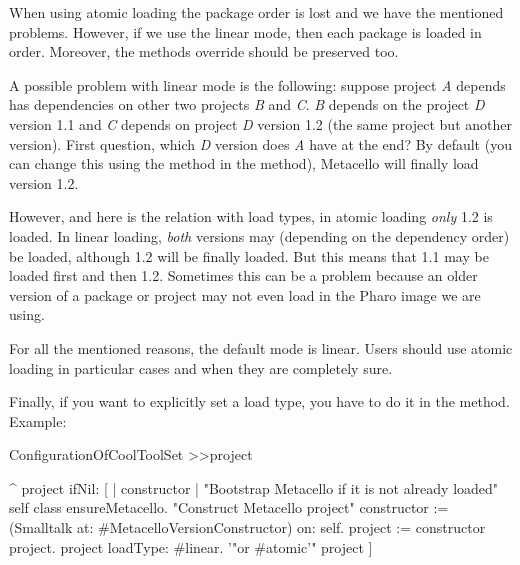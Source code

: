 \documentclass[a4paper,10pt,twoside]{book}
\begin{document}
When using atomic loading the package order is lost and we have the mentioned problems. However, if we use the linear mode, then each package is loaded in order. Moreover, the methods override should be preserved too. 

A possible problem with linear mode is the following: suppose project \emph{A} depends has dependencies on other two projects \emph{B} and \emph{C}. \emph{B} depends on the project \emph{D} version 1.1 and \emph{C} depends on project \emph{D} version 1.2 (the same project but another version). First question, which \emph{D} version does \emph{A} have at the end?  By default (you can change this using the method  in the  method), Metacello will finally load version 1.2.

However, and here is the relation with load types, in atomic loading \emph{only} 1.2 is loaded. In linear loading, \emph{both} versions may (depending on the dependency order) be loaded, although 1.2 will be finally loaded. But this means that 1.1 may be loaded first and then 1.2. Sometimes this can be a problem because an older version of a package or project may not even load in the Pharo image we are using. 

For all the mentioned reasons, the default mode is linear. Users should use atomic loading in particular cases and when they are completely sure. 

Finally, if you want to explicitly set a load type, you have to do it in the  method. Example:

\begin{code}{}
ConfigurationOfCoolToolSet >>project

       ^ project ifNil: [ | constructor |
              "Bootstrap Metacello if it is not already loaded"
              self class ensureMetacello.
              "Construct Metacello project"
              constructor := (Smalltalk at: #MetacelloVersionConstructor) on: self.
              project := constructor project.
              project loadType: #linear. '"or #atomic'"
              project ]

\end{code}
\end{document}
